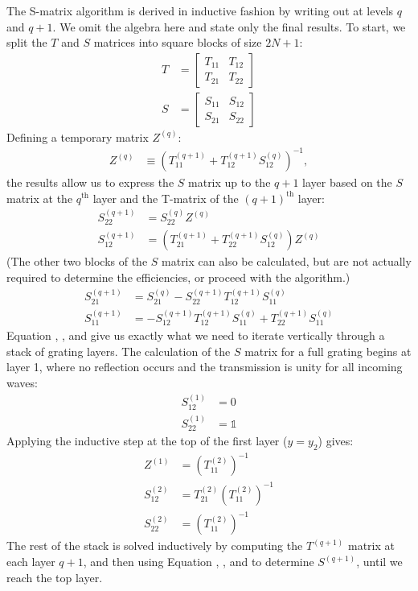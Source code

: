 The S-matrix algorithm is derived in inductive fashion by writing out  at levels $q$ and $q+1$.  We omit the algebra here and state only the final results.  To start, we split the $T$ and $S$ matrices into square blocks of size $2N+1$:
\begin{align}
T &= \left[\begin{array}{c|c}T_{11} & T_{12} \\\hline T_{21} & T_{22}\end{array}\right] \\
S &= \left[\begin{array}{c|c}S_{11} & S_{12} \\\hline S_{21} & S_{22}\end{array}\right]
\end{align}
Defining a temporary matrix $Z^{(q)}$:
\begin{align}
\label{SmatZ}
Z^{(q)} &\equiv \left(T^{(q+1)}_{11} + T^{(q+1)}_{12}S^{(q)}_{12} \right)^{-1},
\end{align}
the results allow us to express the $S$ matrix up to the $q+1$ layer based on the $S$ matrix at the $q^\textrm{th}$ layer and the T-matrix of the $(q+1)^\textrm{th}$ layer:
\begin{align}
\label{Smat22}
S^{(q+1)}_{22} &= S^{(q)}_{22} Z^{(q)} \\
\label{Smat12}
S^{(q+1)}_{12} &= \left(T^{(q+1)}_{21} + T^{(q+1)}_{22}S^{(q)}_{12} \right) Z^{(q)}
\end{align}
(The other two blocks of the $S$ matrix can also be calculated, but are not actually required to determine the efficiencies, or proceed with the algorithm.)
\begin{align}
S^{(q+1)}_{21} &= S^{(q)}_{21} - S^{(q+1)}_{22} T^{(q+1)}_{12} S^{(q)}_{11} \\
S^{(q+1)}_{11} &= - S^{(q+1)}_{12} T^{(q+1)}_{12} S^{(q)}_{11} + T^{(q+1)}_{22}S^{(q)}_{11}
\end{align}
Equation , , and  give us exactly what we need to iterate vertically through a stack of grating layers.  The calculation of the $S$ matrix for a full grating begins at layer 1, where no reflection occurs and the transmission is unity for all incoming waves:
\begin{align}
S^{(1)}_{12} &= 0\\
S^{(1)}_{22} &= \mathbb{1}
\end{align}
Applying the inductive step at the top of the first layer ($y=y_2$) gives:
\begin{align}
Z^{(1)} &= \left(T^{(2)}_{11}  \right)^{-1} \\
S^{(2)}_{12} &= T^{(2)}_{21}  \left(T^{(2)}_{11}  \right)^{-1} \\
S^{(2)}_{22} &= \left(T^{(2)}_{11}  \right)^{-1}
\end{align}
The rest of the stack is solved inductively by computing the $T^{(q+1)}$ matrix at each layer $q+1$, and then using Equation , , and  to determine $S^{(q+1)}$, until we reach the top layer.

